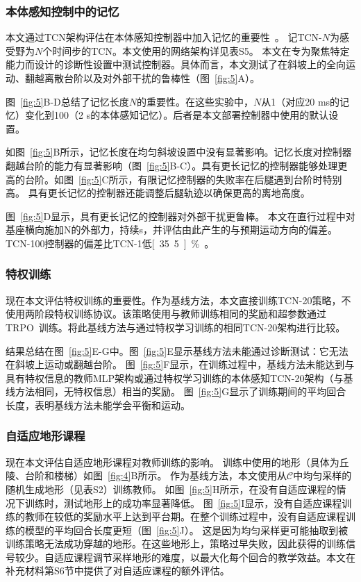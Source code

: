 \documentclass[9pt,twocolumn,twoside]{osajnl}
\begin{document}
\subsubsection*{本体感知控制中的记忆}

本文通过TCN架构评估在本体感知控制器中加入记忆的重要性~\cite{bai2018empirical}。
记TCN-$N$为感受野为$N$个时间步的TCN。本文使用的网络架构详见表S5。
本文在专为聚焦特定能力而设计的诊断性设置中测试控制器。具体而言，本文测试了在斜坡上的全向运动、翻越离散台阶以及对外部干扰的鲁棒性（图~\ref{fig:5}A）。

图~\ref{fig:5}B-D总结了记忆长度$N$的重要性。在这些实验中，$N$从1（对应20 ms的记忆）变化到100（2 s的本体感知记忆）。后者是本文部署控制器中使用的默认设置。

如图~\ref{fig:5}B所示，记忆长度在均匀斜坡设置中没有显著影响。记忆长度对控制器翻越台阶的能力有显著影响（图~\ref{fig:5}B-C）。具有更长记忆的控制器能够处理更高的台阶。如图~\ref{fig:5}C所示，有限记忆控制器的失败率在后腿遇到台阶时特别高。
具有更长记忆的控制器还能调整后腿轨迹以确保更高的离地高度。

图~\ref{fig:5}D显示，具有更长记忆的控制器对外部干扰更鲁棒。
本文在直行过程中对基座横向施加\unit[50]{N}的外部力，持续\unit[5]{s}，并评估由此产生的与预期运动方向的偏差。TCN-100控制器的偏差比TCN-1低\unit[35.5]{\%}。

\subsubsection*{特权训练}

现在本文评估特权训练的重要性。作为基线方法，本文直接训练TCN-20策略，不使用两阶段特权训练协议。该策略使用与教师训练相同的奖励和超参数通过TRPO~\cite{schulman2015trust}训练。将此基线方法与通过特权学习训练的相同TCN-20架构进行比较。

结果总结在图~\ref{fig:5}E-G中。图~\ref{fig:5}E显示基线方法未能通过诊断测试：它无法在斜坡上运动或翻越台阶。
图~\ref{fig:5}F显示，在训练过程中，基线方法未能达到与具有特权信息的教师MLP架构或通过特权学习训练的本体感知TCN-20架构（与基线方法相同，无特权信息）相当的奖励。
图~\ref{fig:5}G显示了训练期间的平均回合长度，表明基线方法未能学会平衡和运动。

\subsubsection*{自适应地形课程}
现在本文评估自适应地形课程对教师训练的影响。
训练中使用的地形（具体为丘陵、台阶和楼梯）如图~\ref{fig:4}B所示。
作为基线方法，本文使用从$\mathcal{C}$中均匀采样的随机生成地形（见表S2）训练教师。
如图~\ref{fig:5}H所示，在没有自适应课程的情况下训练时，测试地形上的成功率显著降低。
图~\ref{fig:5}I显示，没有自适应课程训练的教师在较低的奖励水平上达到平台期。在整个训练过程中，没有自适应课程训练的模型的平均回合长度更短（图~\ref{fig:5}J）。
这是因为均匀采样更可能抽取到被训练策略无法成功穿越的地形。在这些地形上，策略过早失败，因此获得的训练信号较少。自适应课程调节采样地形的难度，以最大化每个回合的教学效益。本文在补充材料第S6节中提供了对自适应课程的额外评估。
\end{document}
